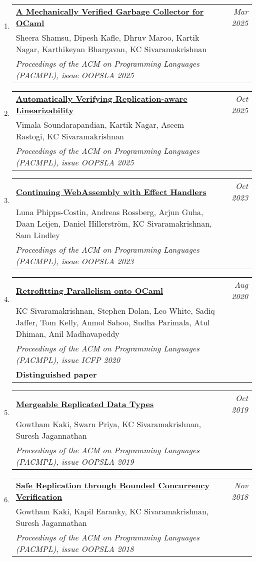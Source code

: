 \documentclass[10pt]{article}
\makeatletter
\newcommand{\lbar}[1]{{\color{#1}\ding{118}}\hspace*{2pt}}
\newenvironment{benumerate}[2]{
    \let\oldItem\item
    \def\item{\addtocounter{enumi}{-2}\oldItem}
    \begin{enumerate}[#2] \itemsep3pt
    \setcounter{enumi}{#1}
    \addtocounter{enumi}{1}}
  {\end{enumerate}}
\newenvironment{publication}[5]
{ \item
  \begin{tabular*}{7.5in}{p{6.3in}@{\extracolsep{\fill}}r}
    \href{#1}{\textbf{#2}} & \textit{#3}\\ #4 &\\ \textit{#5}&\\
  \end{tabular*}
} {}
\newenvironment{publicationNote}[6]
{ \item
  \begin{tabular*}{7.5in}{p{6.3in}@{\extracolsep{\fill}}r}
    \href{#1}{\textbf{#2}} & \textit{#3}\\ #4 &\\ \textit{#5}\\ \textbf{#6} \\
  \end{tabular*}
} {}
\newenvironment{region}[3]{%
  \vspace*{0.5ex}
  {\scalebox{1.4}{\textbf{#1}}}
  \begin{benumerate}{#3}{\color{RoyalBlue}#2}}
  {\end{benumerate}\vspace{0.8ex}}
\makeatother
\begin{document}
\begin{region} {\lbar{purple}Journal Publications}{{J}1}{10}

  \begin{publication}{https://kcsrk.info/papers/verifiedgc_feb_25.pdf}
    {A Mechanically Verified Garbage Collector for OCaml}
    {Mar 2025}{Sheera Shamsu, Dipesh Kafle, Dhruv Maroo, Kartik Nagar, Karthikeyan Bhargavan, KC Sivaramakrishnan}
		{Proceedings of the ACM on Programming Languages (PACMPL), issue OOPSLA 2025}
	\end{publication}

  \begin{publication}{https://kcsrk.info/papers/mrdtconverge_jan_25.pdf}
    {Automatically Verifying Replication-aware Linearizability}
    {Oct 2025}{Vimala Soundarapandian, Kartik Nagar, Aseem Rastogi, KC Sivaramakrishnan}
		{Proceedings of the ACM on Programming Languages (PACMPL), issue OOPSLA 2025}
	\end{publication}

	\begin{publication}{https://kcsrk.info/papers/wasmfx_oopsla23.pdf}
    {Continuing WebAssembly with Effect Handlers}
    {Oct 2023}{Luna Phipps-Costin, Andreas Rossberg, Arjun Guha, Daan Leijen, Daniel Hillerström, KC Sivaramakrishnan, Sam Lindley}
		{Proceedings of the ACM on Programming Languages (PACMPL), issue OOPSLA 2023}
	\end{publication}

	\begin{publicationNote}{https://kcsrk.info/papers/retro-parallel_icfp_20.pdf}
		{Retrofitting Parallelism onto OCaml}
		{Aug 2020}{KC Sivaramakrishnan, Stephen Dolan, Leo White, Sadiq Jaffer, Tom Kelly, Anmol Sahoo, Sudha Parimala, Atul Dhiman, Anil Madhavapeddy}
		{Proceedings of the ACM on Programming Languages (PACMPL), issue ICFP 2020}
		{Distinguished paper}
	\end{publicationNote}

	\begin{publication}{http://kcsrk.info/papers/oopsla19-mrdt.pdf}
		{Mergeable Replicated Data Types}
    {Oct 2019}{Gowtham Kaki, Swarn Priya, KC Sivaramakrishnan, Suresh Jagannathan}
		{Proceedings of the ACM on Programming Languages (PACMPL), issue OOPSLA 2019}
  \end{publication}

	\begin{publication}{http://kcsrk.info/papers/oopsla18-q9.pdf}
		{Safe Replication through Bounded Concurrency Verification}
    {Nov 2018}{Gowtham Kaki, Kapil Earanky, KC Sivaramakrishnan, Suresh Jagannathan}
		{Proceedings of the ACM on Programming Languages (PACMPL), issue OOPSLA 2018}
  \end{publication}


\end{region}
\end{document}
